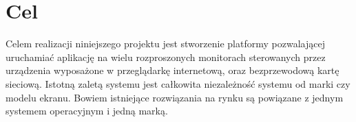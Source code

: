 \section{Cel}
\label{sec:goal}
Celem realizacji niniejszego projektu jest stworzenie platformy pozwalającej uruchamiać aplikację na wielu rozproszonych monitorach sterowanych przez urządzenia wyposażone w przeglądarkę internetową, oraz bezprzewodową kartę sieciową.  
Istotną zaletą systemu jest całkowita niezależność systemu od marki czy modelu ekranu. Bowiem istniejące rozwiązania na rynku są powiązane z jednym systemem operacyjnym i jedną marką.
